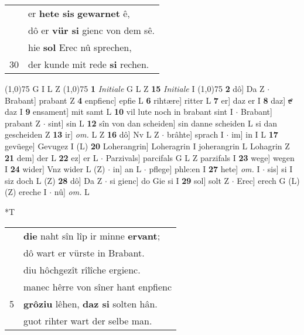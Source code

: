\documentclass[8pt,a4paper,notitlepage]{article}
\begin{document}
\begin{table}[ht]
\begin{minipage}[t]{0.5\linewidth}
\begin{tabular}{rl}
 & er \textbf{hete sis} \textbf{gewarnet} ê,\\ 
 & dô er \textbf{vür si} gienc von dem sê.\\ 
 & hie \textbf{sol} Erec nû sprechen,\\ 
30 & der kunde mit rede \textbf{si} rechen.\\ 
\end{tabular}
\scriptsize
\line(1,0){75} \newline
G I L Z \newline
\line(1,0){75} \newline
\textbf{1} \textit{Initiale} G L Z  \textbf{15} \textit{Initiale} I  \newline
\line(1,0){75} \newline
\textbf{2} dô] Da Z  $\cdot$ Brabant] prabant Z \textbf{4} enpfienc] epfie L \textbf{6} rihtære] ritter L \textbf{7} er] daz er I \textbf{8} daz] \sout{eͤ} daz I \textbf{9} ensament] mit samt L \textbf{10} vil lute noch in brabant sint I  $\cdot$ Brabant] prabant Z  $\cdot$ sint] sin L \textbf{12} sîn von dan scheiden] sin danne scheiden L si dan gescheiden Z \textbf{13} ir] \textit{om.} L Z \textbf{16} dô] Nv L Z  $\cdot$ brâhte] sprach I  $\cdot$ im] in I L \textbf{17} gevüege] Gevugez I (L) \textbf{20} Loherangrin] Loheragrin I joherangrin L Lohagrin Z \textbf{21} dem] der L \textbf{22} ez] er L  $\cdot$ Parzivals] parcifals G L Z parzifals I \textbf{23} wege] wegen I \textbf{24} wider] Vnz wider L (Z)  $\cdot$ in] an L  $\cdot$ pflege] phle:en I \textbf{27} hete] \textit{om.} I  $\cdot$ sis] si I siz doch L (Z) \textbf{28} dô] Da Z  $\cdot$ si gienc] do Gie si I \textbf{29} sol] solt Z  $\cdot$ Erec] erech G (L) (Z) ereche I  $\cdot$ nû] \textit{om.} L \newline
\end{minipage}
\hspace{0.5cm}
\begin{minipage}[t]{0.5\linewidth}
\small
\begin{center}*T
\end{center}
\begin{tabular}{rl}
 & \textbf{die} naht sîn lîp ir minne \textbf{ervant};\\ 
 & dô wart er vürste in Brabant.\\ 
 & diu hôchgezît rîlîche ergienc.\\ 
 & manec hêrre von sîner hant enpfienc\\ 
5 & \textbf{grôziu} lêhen, \textbf{daz si} solten hân.\\ 
 & guot rihter wart der selbe man.\\ 

\end{tabular}
\end{minipage}
\end{table}
\end{document}
